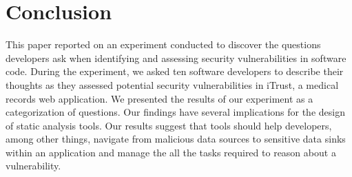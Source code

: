 \documentclass{acm_proc_article-sp}
\newcommand{\blind}[1]{#1}
\begin{document}
\section{Conclusion}
\label{sec:concl}
This paper reported on an experiment conducted to discover the questions developers ask when identifying and assessing security vulnerabilities in software code.
During the experiment, we asked ten software developers to describe their thoughts as they assessed potential security vulnerabilities in iTrust, a medical records web application.
We presented the results of our experiment as a categorization of questions.
Our findings have several implications for the design of static analysis tools. Our results suggest that tools should help developers, among other things, navigate from malicious data sources to sensitive data sinks within an application and manage the all the tasks required to reason about a vulnerability.











%



\end{document}
